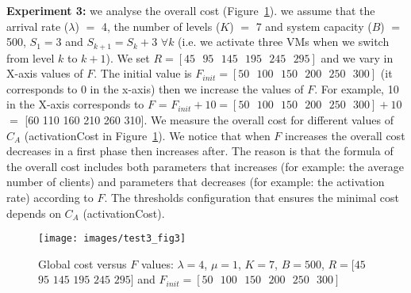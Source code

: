 \documentclass[conference]{IEEEtran}
\begin{document}
\textbf{Experiment 3:} we analyse the overall cost (Figure~\ref{fig:image-chap4-1_par_1_test3_fig3}). we assume that the arrival rate ($\lambda$) $=$ 4, the number of levels ($K$) $=$ 7 and system capacity ($B$) $=$ 500, $S_{1}=3$ and 
$S_{k+1}=S_{k}+3$ $\forall k$ (i.e. we activate three VMs when we switch from level $k$ to $k+1$). We set $R=[45\mbox{ }95\mbox{ }145\mbox{ }195\mbox{ }245\mbox{ }295]$ and we vary in X-axis values of $F$. The initial value is $F_{init}=[50\mbox{ }100\mbox{ }150\mbox{ }200\mbox{ }250\mbox{ }300]$ (it corresponds to 0 in the x-axis) then we increase the values of $F$. For example, 10 in the X-axis corresponds to $F$ = $F_{init}+10=[50\mbox{ }100\mbox{ }150\mbox{ }200\mbox{ }250\mbox{ }300]+10$ $=$ [60 110 160 210 260 310]. We measure the overall cost for different values of $C_{A}$ (activationCost in Figure~\ref{fig:image-chap4-1_par_1_test3_fig3}). We notice that when $F$ increases the overall cost decreases in a first phase then increases after. The reason is that the formula of the overall cost includes both parameters that increases (for example: the average number of clients) and parameters that decreases (for example: the activation rate) according to $F$. The thresholds configuration that ensures the minimal cost depends on $C_{A}$ (activationCost).

\begin{figure}[!ht]
\centering
\texttt{[image: images/test3\_fig3]}
\caption{Global cost versus $F$ values: $\lambda=4$,  $\mu=1$, $K=7$, $B=500$, $R=[45$ $95$ $145$ $195$ $245$ $295]$ and $F_{init}=[50\mbox{ }100\mbox{ }150\mbox{ }200\mbox{ }250\mbox{ }300]$}
\label{fig:image-chap4-1_par_1_test3_fig3}
\end{figure}
\end{document}

